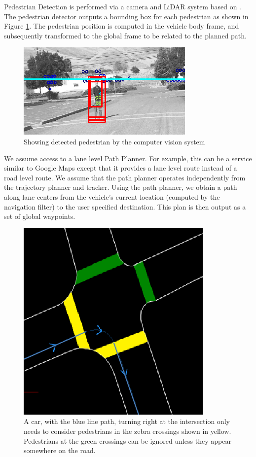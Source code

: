 \documentclass[letterpaper, 10 pt, conference]{ieeeconf}  %
\begin{document}
Pedestrian Detection is performed via a camera and LiDAR system based on \cite{Gepperth2013,Gepperth2014}.
The pedestrian detector outputs a bounding box for each pedestrian as shown in Figure \ref{fig:ped}.
The pedestrian position is computed in the vehicle body frame, and subsequently transformed to the global frame to be related to the planned path.

\begin{figure}[tb]
  \centering
  \includegraphics[width=0.5\columnwidth]{graphics/ped3.png}
  \caption{Showing detected pedestrian by the computer vision system
  \newline
  }
  \label{fig:ped}
\end{figure}

We assume access to a lane level Path Planner. For example, this can be a service similar to Google Maps except that it provides a lane level route instead of a road level route. 
We assume that the path planner operates independently from the trajectory planner and tracker.
Using the path planner, we obtain a path along lane centers from the vehicle's current location (computed by the navigation filter) to the user specified destination.
This plan is then output as a set of global waypoints.



\begin{figure}[tb]
  \centering
  \includegraphics[width=0.3\columnwidth]{graphics/IntersectionCrosswalks.png}
  \caption{
    A car, with the blue line path, turning right at the intersection only needs to consider pedestrians in the zebra crossings shown in yellow.
    Pedestrians at the green crossings can be ignored unless they appear somewhere on the road.
  }
  \label{fig:intersect}
\end{figure}
\end{document}
